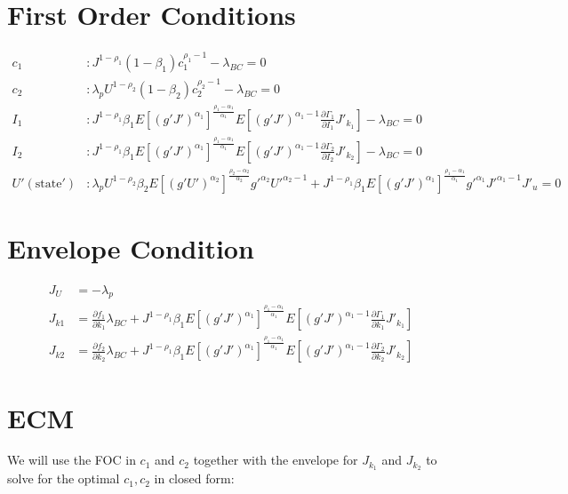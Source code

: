 \documentclass[10pt]{article}
\newcommand{\fracpd}[2]{
  \ensuremath{\frac{\partial #1}{\partial #2}}
}
\begin{document}
\section{First Order Conditions}

  \begin{align*}
    c_1 &: J^{1 - \rho_1} (1 - \beta_1) c_1^{\rho_1 - 1} - \lambda_{BC} = 0 \\
    c_2 &: \lambda_p U^{1 - \rho_2} (1 - \beta_2) c_2^{\rho_2 - 1} - \lambda_{BC} = 0 \\
    I_1 &: J^{1-\rho_1} \beta_1 E\left[(g'J')^{\alpha_1} \right]^{\frac{\rho_1 - \alpha_1}{\alpha_1}} E \left[ (g'J')^{\alpha_1 - 1} \fracpd{\Gamma_1}{I_1} J'_{k_1} \right] - \lambda_{BC} = 0 \\
    I_2 &: J^{1-\rho_1} \beta_1 E\left[(g'J')^{\alpha_1} \right]^{\frac{\rho_1 - \alpha_1}{\alpha_1}} E \left[ (g'J')^{\alpha_1 - 1} \fracpd{\Gamma_2}{I_2} J'_{k_2} \right] - \lambda_{BC} = 0 \\
    U'(\text{state}') &: \lambda_p U^{1 - \rho_2} \beta_2 E \left[ (g'U')^{\alpha_2} \right]^{\frac{\rho_2 - \alpha_2}{\alpha_2}} g'^{\alpha_2} U'^{\alpha_2 - 1} + J^{1 - \rho_1} \beta_1 E \left[ (g'J')^{\alpha_1} \right]^{\frac{\rho_1 - \alpha_1}{\alpha_1}} g'^{\alpha_1}J'^{\alpha_1 -1}J'_{u} = 0
  \end{align*}


\section{Envelope Condition}

\begin{align*}
  J_U &= - \lambda_p \\
  J_{k1} &= \fracpd{f_1}{k_1} \lambda_{BC} +  J^{1-\rho_1} \beta_1 E\left[(g'J')^{\alpha_1} \right]^{\frac{\rho_1 - \alpha_1}{\alpha_1}} E \left[ (g'J')^{\alpha_1 - 1} \fracpd{\Gamma_1}{k_1} J'_{k_1} \right] \\
  J_{k2} &= \fracpd{f_2}{k_2} \lambda_{BC} +  J^{1-\rho_1} \beta_1 E\left[(g'J')^{\alpha_1} \right]^{\frac{\rho_1 - \alpha_1}{\alpha_1}} E \left[ (g'J')^{\alpha_1 - 1} \fracpd{\Gamma_2}{k_2} J'_{k_2} \right]
\end{align*}

\section{ECM}

We will use the FOC in $c_1$ and $c_2$ together with the envelope for $J_{k_1}$
and $J_{k_2}$ to solve for the optimal $c_1,c_2$ in closed form:
\end{document}
